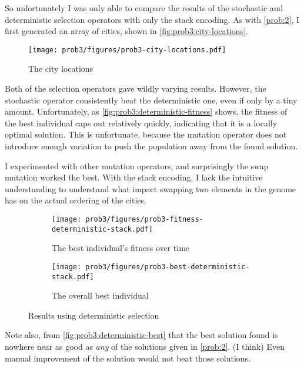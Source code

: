 \documentclass{article}
\begin{document}
So unfortunately I was only able to compare the results of the stochastic and deterministic
selection operators with only the stack encoding. As with \autoref{prob:2}, I first generated an
array of cities, shown in \autoref{fig:prob3:city-locations}.

\begin{figure}[h]
    \centering
    \texttt{[image: prob3/figures/prob3-city-locations.pdf]}
    \caption{The city locations}\label{fig:prob3:city-locations}
\end{figure}

Both of the selection operators gave wildly varying results. However, the stochastic operator
consistently beat the deterministic one, even if only by a tiny amount. Unfortunately, as
\autoref{fig:prob3:deterministic-fitness} shows, the fitness of the best individual caps out
relatively quickly, indicating that it is a locally optimal solution. This is unfortunate, because
the mutation operator does not introduce enough variation to push the population away from the
found solution.

I experimented with other mutation operators, and surprisingly the swap mutation worked the best.
With the stack encoding, I lack the intuitive understanding to understand what impact swapping two
elements in the genome has on the actual ordering of the cities.

\begin{figure}[h]
    \centering
    \begin{subfigure}[b]{0.45\textwidth}
        \texttt{[image: prob3/figures/prob3-fitness-deterministic-stack.pdf]}
        \caption{The best individual's fitness over time}\label{fig:prob3:deterministic-fitness}
    \end{subfigure}
    \begin{subfigure}[b]{0.45\textwidth}
        \texttt{[image: prob3/figures/prob3-best-deterministic-stack.pdf]}
        \caption{The overall best individual}\label{fig:prob3:deterministic-best}
    \end{subfigure}
    \caption{Results using deterministic selection}\label{fig:prob3:deterministic-results}
\end{figure}

Note also, from \autoref{fig:prob3:deterministic-best} that the best solution found is nowhere near
as good as \textit{any} of the solutions given in \autoref{prob:2}. (I think) Even manual
improvement of the solution would not beat those solutions.
\end{document}
